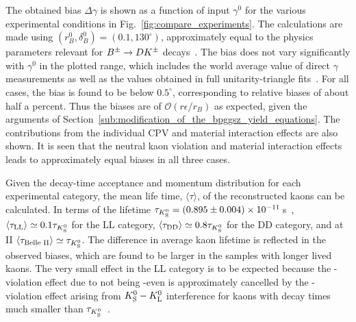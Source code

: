 The obtained bias $\Delta\gamma$ is shown as a function of input $\gamma^0$ for the various experimental conditions in Fig.~\ref{fig:compare_experiments}. The calculations are made using $(r_B^0, \delta_B^0)=(0.1, 130^\circ)$, approximately equal to the physics parameters relevant for ${{B}^\pm}\rightarrow{\ensuremath{D}}{\ensuremath{{K}^\pm}}$ decays~\cite{UTfit-UT,HFLAV}.  The bias does not vary significantly with $\gamma^0$ in the plotted range, which includes the world average value of direct $\gamma$ measurements as well as the values obtained in full unitarity-triangle fits~\cite{HFLAV,UTfit-UT,CKMfitter2015}. For all cases, the bias is found to be below $0.5^\circ$, corresponding to relative biases of about half a percent. Thus the biases are of $\mathcal O(r\epsilon /r_B)$ as expected, given the arguments of Section~\ref{sub:modification_of_the_bpggsz_yield_equations}. The contributions from the individual \KS CPV and material interaction effects are also shown. It is seen that the neutral kaon \CP violation and material interaction effects leads to approximately equal biases in all three cases. 

Given the decay-time acceptance and momentum distribution for each experimental category, the mean life time, $\langle\tau\rangle$, of the reconstructed kaons can be calculated. In terms of the \KS lifetime ${\tau_{{K}^0_{\mathrm{S}}}=(0.895\pm0.004)\times10^{-11}\,}$s~\cite{PDG2020}, $\langle\tau_\text{LL}\rangle\simeq0.1\tau_{{K}^0_{\mathrm{S}}}$ for the \lhcb LL category, $\langle\tau_\text{DD}\rangle\simeq0.8\tau_{{K}^0_{\mathrm{S}}}$ for the \lhcb DD category, and at \belle II $\langle\tau_\text{Belle II}\rangle\simeq\tau_{{K}^0_{\mathrm{S}}}$. The difference in average kaon lifetime is reflected in the observed biases, which are found to be larger in the samples with longer lived kaons. The very small effect in the LL category is to be expected because the \CP-violation effect due to \KS not being \CP-even is approximately cancelled by the \CP-violation effect arising from ${{K}^0_{\mathrm{S}}}-{{K}^0_{\mathrm{L}}}$ interference for kaons with decay times much smaller than $\tau_{{K}^0_{\mathrm{S}}}$~\cite{grossmanCPViolationKSv2012}. 

